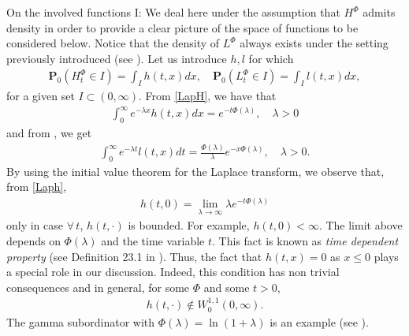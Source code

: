 \documentclass[11pt,a4paper]{article}
\theoremstyle{plain}
\theoremstyle{definition}
\theoremstyle{remark}
\begin{document}
	{\sc On the involved functions I:}
	We deal here under the assumption that $H^\Phi$ admits density in order to provide a clear picture of the space of functions to be considered below. Notice that the density of $L^\Phi$ always exists under the setting previously introduced (see \cite[Theorem 3.1]{meerschaert2008triangular}). Let us introduce $h,l$ for which 		\begin{align*}
		\mathbf{P}_0(H_t^\Phi \in I) = \int_I h(t, x)dx,\quad  \mathbf{P}_0(L_t^\Phi \in I) = \int_I l(t, x)dx ,
	\end{align*}
	for a given set $I \subset (0,\infty)$. From \eqref{LapH}, we have that
	\begin{align}
		\label{Laph}
		\int_0^\infty e^{-\lambda x} h(t,x) dx= e^{-t\Phi(\lambda)}, \quad \lambda >0
	\end{align}
	and from \cite[formula (3.13)]{meerschaert2008triangular}, we get
	\begin{align}
		\label{LapL}
		\int_0^\infty e^{-\lambda t} l(t,x) dt=\frac{\Phi(\lambda)}{\lambda} e^{-x \Phi(\lambda)}, \quad \lambda >0.
	\end{align}
	By using the initial value theorem for the Laplace transform, we observe that, from \eqref{Laph},
	\begin{align}
		\label{limithzero}
		h(t,0)=\lim_{\lambda \to \infty} \lambda e^{-t \Phi(\lambda)}
	\end{align}
	only in case $\forall\, t$, $h(t, \cdot)$ is bounded. For example, $h(t,0)<\infty$. The limit above depends on $\Phi(\lambda)$ and the time variable $t$. This fact is known as \emph{time dependent property} (see Definition 23.1 in \cite{sato1999levy}).  Thus, the fact that $h(t,x)=0$ as $x \leq 0$ plays a special role in our discussion. Indeed, this condition has non trivial consequences and in general, for some $\Phi$ and some $t>0$,
	\begin{align*}
		h(t, \cdot) \notin W^{1,1}_0(0, \infty).
	\end{align*}
	The gamma subordinator with $\Phi(\lambda) = \ln (1+\lambda)$ is an example (see \cite{colantoni2021inverse}).\\
	
	
	
\end{document}
